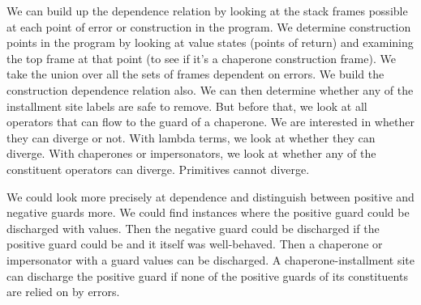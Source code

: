 We can build up the dependence relation by looking at the stack frames possible at each point of error or construction in the program.
We determine construction points in the program by looking at value states (points of return) and examining the top frame at that point (to see if it's a chaperone construction frame).
We take the union over all the sets of frames dependent on errors.
We build the construction dependence relation also.
We can then determine whether any of the installment site labels are safe to remove.
But before that, we look at all operators that can flow to the guard of a chaperone.
We are interested in whether they can diverge or not.
With lambda terms, we look at whether they can diverge.
With chaperones or impersonators, we look at whether any of the constituent operators can diverge.
Primitives cannot diverge.

We could look more precisely at dependence and distinguish between positive and negative guards more.
We could find instances where the positive guard could be discharged with values. Then the negative guard could be discharged if the positive guard could be and it itself was well-behaved.
Then a chaperone or impersonator with a guard values can be discharged.
A chaperone-installment site can discharge the positive guard if none of the positive guards of its constituents are relied on by errors.